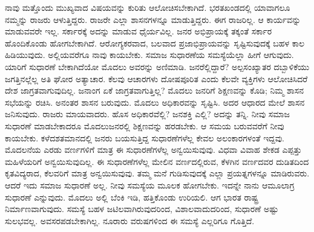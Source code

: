 \vskip   4pt

ನಾವು ಮತ್ತೊಂದು ಮುಖ್ಯವಾದ ವಿಷಯವನ್ನು ಕುರಿತು ಆಲೋಚಿಸಬೇಕಾಗಿದೆ. ಭರತಖಂಡದಲ್ಲಿ ಯಾವಾಗಲೂ ನಮ್ಮನ್ನು ರಾಜರು ಆಳುತ್ತಿದ್ದರು. ರಾಜರೇ ಎಲ್ಲಾ ಶಾಸನಗಳನ್ನೂ ಮಾಡುತ್ತಿದ್ದರು. ಈಗ ರಾಜರಿಲ್ಲ. ಆ ಕಾರ್ಯವನ್ನು ಮಾಡುವವರೇ ಇಲ್ಲ. ಸರ್ಕಾರಕ್ಕೆ ಅದನ್ನು ಮಾಡುವ ಧೈರ್ಯವಿಲ್ಲ. ಜನರ ಅಭಿಪ್ರಾಯಕ್ಕೆ ತಕ್ಕಂತೆ ಸರ್ಕಾರ ಹೊಂದಿಕೊಂಡು ಹೋಗಬೇಕಾಗಿದೆ. ಆರೋಗ್ಯಕರವಾದ, ಬಲವಾದ ಪ್ರಜಾಭಿಪ್ರಾಯವನ್ನು ಸೃಷ್ಟಿಸುವುದಕ್ಕೆ ಬಹಳ ಕಾಲ ಹಿಡಿಯುವುದು. ಅಲ್ಲಿಯವರೆಗೂ ನಾವು ಕಾಯಬೇಕು. ಸಮಾಜ ಸುಧಾರಣೆಯ ಸಮಸ್ಯೆಯೆಲ್ಲಾ ಹೀಗೆ ಆಗುವುದು. ಯಾರಿಗೆ ಸುಧಾರಣೆ ಬೇಕಾಗಿದೆಯೋ ಮೊದಲು ಅವರನ್ನು ಅಣಿಮಾಡಿ. ಜನರೆಲ್ಲಿದ್ದಾರೆ? ಅಲ್ಪಸಂಖ್ಯಾತರ ದಬ್ಬಾಳಿಕೆಯು ಜಗತ್ತಿನಲ್ಲೆಲ್ಲ ಅತಿ ಘೋರ ಅತ್ಯಾಚಾರ. ಕೆಲವು ಆಚಾರಗಳು ದೋಷಪೂರಿತ ಎಂದು ಕೆಲವೇ ವ್ಯಕ್ತಿಗಳು ಆಲೋಚಿಸಿದರೆ ದೇಶ ಜಾಗ್ರತವಾಗುವುದಿಲ್ಲ. ಜನಾಂಗ ಏಕೆ ಜಾಗ್ರತವಾಗುತ್ತಿಲ್ಲ? ಮೊದಲು ಜನರಿಗೆ ಶಿಕ್ಷಣವನ್ನು ಕೊಡಿ; ನಿಮ್ಮ ಶಾಸನ ಸಭೆಯನ್ನು ರಚಿಸಿ. ಅನಂತರ ಶಾಸನ ಬರುವುದು. ಮೊದಲು ಅಧಿಕಾರವನ್ನು ಸೃಷ್ಟಿಸಿ. ಅದರ ಆಧಾರದ ಮೇಲೆ ಶಾಸನ ಜನಿಸುವುದು. ರಾಜರು ಮಾಯವಾದರು. ಹೊಸ ಅಧಿಕಾರವೆಲ್ಲಿ? ಜನಶಕ್ತಿ ಎಲ್ಲಿ? ಅದನ್ನು ತನ್ನಿ. ನೀವು ಸಮಾಜ ಸುಧಾರಣೆ ಮಾಡಬೇಕಾದರೂ ಮೊದಲು\break ಜನರಲ್ಲಿ ಶಿಕ್ಷಣವನ್ನು ಹರಡಬೇಕು. ಆ ಸಮಯ ಬರುವವರೆಗೆ ನೀವು ಕಾಯಬೇಕು. ಕಳೆದ\break ಶತಮಾನದಲ್ಲಿ ಜನರು ಬಯಸುತ್ತಿದ್ದ ಸುಧಾರಣೆಗಳೆಲ್ಲ ಕೇವಲ ಅಲಂಕಾರಗಳಂತೆ ಇದ್ದವು. ಮೊದಲನೆಯ ಎರಡು ವರ್ಣಗಳಿಗೆ ಮಾತ್ರ ಈ ಸುಧಾರಣೆಗಳೆಲ್ಲ ಅನ್ವಯಿಸುವುವು. ವಿಧವಾ ವಿವಾಹ ಶೇಕಡ ಎಪ್ಪತ್ತು ಮಹಿಳೆಯರಿಗೆ ಅನ್ವಯಿಸುವುದಿಲ್ಲ. ಈ ಸುಧಾರಣೆಗಳೆಲ್ಲ ಮೇಲಿನ ವರ್ಣದಲ್ಲಿರುವ, ಕೆಳಗಿನ ವರ್ಣದವರ ದುಡಿತದಿಂದ ಕೃತವಿದ್ಯರಾದ, ಕೆಲವರಿಗೆ ಮಾತ್ರ ಅನ್ವಯಿಸುವುವು. ತಮ್ಮ ಮನೆ ಗುಡಿಸುವುದಕ್ಕೆ ಎಲ್ಲಾ ಪ್ರಯತ್ನಗಳನ್ನೂ ಮಾಡಿರುವರು. ಆದರೆ ಇದು ಸಮಾಜ ಸುಧಾರಣೆ ಅಲ್ಲ. ನೀವು ಸಮಸ್ಯೆಯ ಮೂಲಕ ಹೋಗಬೇಕು. ಇದನ್ನೇ ನಾನು ಆಮೂಲಾಗ್ರ ಸುಧಾರಣೆ ಎನ್ನುವುದು. ಮೊದಲು ಅಲ್ಲಿ ಬೆಂಕಿ ಇಡಿ, ಹತ್ತಿಕೊಂಡು ಉರಿಯಲಿ. ಆಗ ಭಾರತ ರಾಷ್ಟ್ರ ನಿರ್ಮಾಣವಾಗುವುದು. ಸಮಸ್ಯೆ ಬಹಳ ಜಟಿಲವಾಗಿರುವುದರಿಂದ, ವಿಶಾಲವಾದುದರಿಂದ, ಸುಧಾರಣೆ ಅಷ್ಟು ಸುಲಭವಲ್ಲ. ಅವಸರಪಡಬೇಕಾಗಿಲ್ಲ. ನೂರಾರು ವರುಷಗಳಿಂದ ಈ ಸಮಸ್ಯೆ ಎಲ್ಲರಿಗೂ ಗೊತ್ತಿದೆ.

\vskip   4pt


